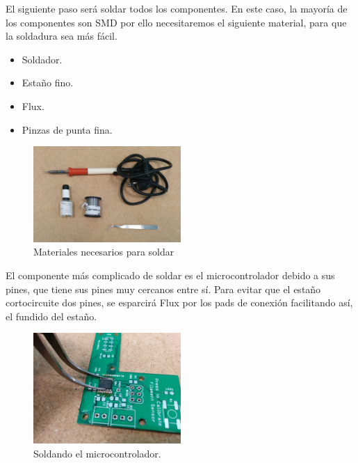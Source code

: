 El siguiente paso será soldar todos los componentes. En este caso, la mayoría de los componentes son SMD por ello necesitaremos el siguiente material, para que la soldadura sea más fácil.
	\begin{itemize}
		\item{Soldador.}
		\item{Estaño fino.}
		\item{Flux.}
		\item{Pinzas de punta fina.}
	\end{itemize}
   \begin{figure}[H]
            \centering
            \includegraphics[width=0.5\textwidth]{images/sensor/IMG_20150417_160216.jpg}
            \caption{Materiales necesarios para soldar}
            \label{fig:sens_materiales}
    \end{figure}
El componente más complicado de soldar es el microcontrolador debido a sus pines, que tiene sus pines muy cercanos entre sí. Para evitar que el estaño cortocircuite dos pines, se esparcirá Flux por los pads de conexión facilitando así, el fundido del estaño.
   \begin{figure}[H]
            \centering
            \includegraphics[width=0.5\textwidth]{images/sensor/IMG_20150414_111135.jpg}
            \caption{Soldando el microcontrolador.}
            \label{fig:sens_micro}
    \end{figure}

